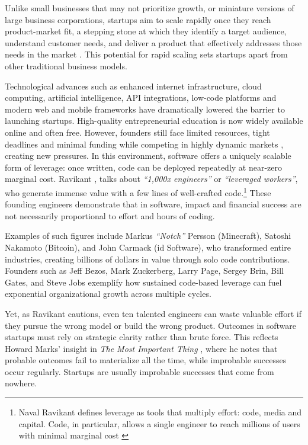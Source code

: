 Unlike small businesses that may not prioritize growth, or miniature versions of large business corporations, startups aim to scale rapidly once they reach product-market fit, a stepping stone at which they identify a target audience, understand customer needs, and deliver a product that effectively addresses those needs in the market \cite{ries2011}. This potential for rapid scaling sets startups apart from other traditional business models.

Technological advances such as enhanced internet infrastructure, cloud computing, artificial intelligence, API integrations, low-code platforms and modern web and mobile frameworks have dramatically lowered the barrier to launching startups. High-quality entrepreneurial education is now widely available online and often free. However, founders still face limited resources, tight deadlines and minimal funding while competing in highly dynamic markets \cite{paternoster2014}, creating new pressures. In this environment, software offers a uniquely scalable form of leverage: once written, code can be deployed repeatedly at near-zero marginal cost. Ravikant \cite{ravikant2020}, talks about \textit{“1,000x engineers”} or \textit{“leveraged workers”}, who generate immense value with a few lines of well-crafted code.\footnote{Naval Ravikant defines leverage as tools that multiply effort: code, media and capital. Code, in particular, allows a single engineer to reach millions of users with minimal marginal cost \cite{ravikant2020}} These founding engineers demonstrate that in software, impact and financial success are not necessarily proportional to effort and hours of coding.


Examples of such figures include Markus \textit{\enquote{Notch}} Persson (Minecraft), Satoshi Nakamoto (Bitcoin), and John Carmack (id Software), who transformed entire industries, creating billions of dollars in value through solo code contributions. Founders such as Jeff Bezos, Mark Zuckerberg, Larry Page, Sergey Brin, Bill Gates, and Steve Jobs exemplify how sustained code-based leverage can fuel exponential organizational growth across multiple cycles.

Yet, as Ravikant \cite{ravikant2020} cautions, even ten talented engineers can waste valuable effort if they pursue the wrong model or build the wrong product. Outcomes in software startups must rely on strategic clarity rather than brute force. This reflects Howard Marks' insight in \textit{The Most Important Thing} \cite{marks2013}, where he notes that probable outcomes fail to materialize all the time, while improbable successes occur regularly. Startups are usually improbable successes that come from nowhere.


